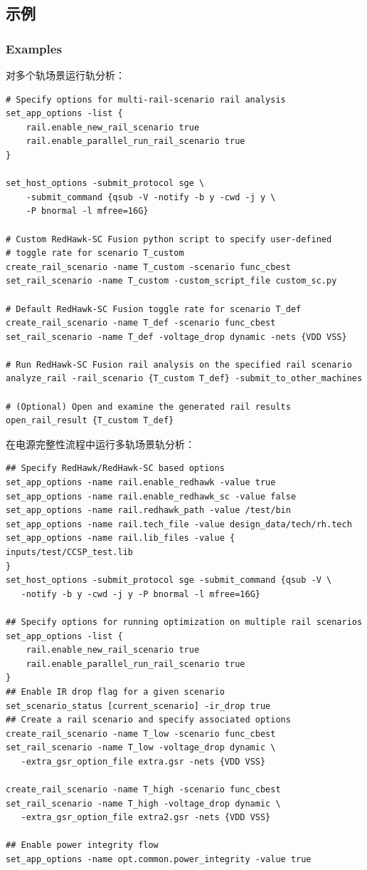 \subsection{示例}
\subsubsection*{Examples}

对多个轨场景运行轨分析：
\begin{lstlisting}
# Specify options for multi-rail-scenario rail analysis
set_app_options -list {
    rail.enable_new_rail_scenario true
    rail.enable_parallel_run_rail_scenario true
}

set_host_options -submit_protocol sge \
    -submit_command {qsub -V -notify -b y -cwd -j y \
    -P bnormal -l mfree=16G}

# Custom RedHawk-SC Fusion python script to specify user-defined
# toggle rate for scenario T_custom
create_rail_scenario -name T_custom -scenario func_cbest
set_rail_scenario -name T_custom -custom_script_file custom_sc.py

# Default RedHawk-SC Fusion toggle rate for scenario T_def
create_rail_scenario -name T_def -scenario func_cbest
set_rail_scenario -name T_def -voltage_drop dynamic -nets {VDD VSS}

# Run RedHawk-SC Fusion rail analysis on the specified rail scenario
analyze_rail -rail_scenario {T_custom T_def} -submit_to_other_machines

# (Optional) Open and examine the generated rail results
open_rail_result {T_custom T_def}
\end{lstlisting}

在电源完整性流程中运行多轨场景轨分析：
\begin{lstlisting}
## Specify RedHawk/RedHawk-SC based options
set_app_options -name rail.enable_redhawk -value true
set_app_options -name rail.enable_redhawk_sc -value false
set_app_options -name rail.redhawk_path -value /test/bin
set_app_options -name rail.tech_file -value design_data/tech/rh.tech
set_app_options -name rail.lib_files -value {
inputs/test/CCSP_test.lib
}
set_host_options -submit_protocol sge -submit_command {qsub -V \
   -notify -b y -cwd -j y -P bnormal -l mfree=16G}

## Specify options for running optimization on multiple rail scenarios
set_app_options -list {
    rail.enable_new_rail_scenario true
    rail.enable_parallel_run_rail_scenario true
}
## Enable IR drop flag for a given scenario
set_scenario_status [current_scenario] -ir_drop true
## Create a rail scenario and specify associated options
create_rail_scenario -name T_low -scenario func_cbest
set_rail_scenario -name T_low -voltage_drop dynamic \
   -extra_gsr_option_file extra.gsr -nets {VDD VSS}

create_rail_scenario -name T_high -scenario func_cbest
set_rail_scenario -name T_high -voltage_drop dynamic \
   -extra_gsr_option_file extra2.gsr -nets {VDD VSS}

## Enable power integrity flow
set_app_options -name opt.common.power_integrity -value true
\end{lstlisting}

